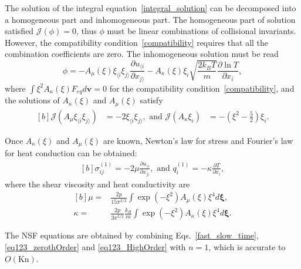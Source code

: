 The solution of the integral equation~\eqref{integral_solution} can be decomposed into a homogeneous part and inhomogeneous part. The homogeneous part of solution satisfied $\mathcal{J}(\phi)=0$, thus $\phi$ must be linear combinations of collisional invariants. However, the compatibility condition~\eqref{compatibility} requires that all the combination coefficients are zero. The inhomogeneous solution must be read
\begin{equation}
\phi=
-A_\mu(\xi)\xi_{\langle{i}} \xi_{j\rangle}\frac{\partial u_{\langle{i}}}{\partial x_{j\rangle}}
-A_\kappa(\xi)\xi_i\sqrt{\frac{2k_BT}{m}}\frac{\partial \ln{T}}{\partial x_i},
\end{equation}
where $\int \xi^2A_\kappa(\xi)F_{eq}d\bm{v}=0$ for the compatibility condition~\eqref{compatibility}, and the solutions of $A_\kappa(\xi)$ and $A_\mu(\xi)$ satisfy
\begin{equation}\label{transport_coefficient_0}
\begin{aligned}[b]
\mathcal{J}(A_\mu\xi_{\langle{i}} \xi_{j\rangle})&=-2\xi_{\langle{i}} \xi_{j\rangle},
\text{~and~}
\mathcal{J}(A_\kappa\xi_i)&=-\left(\xi^2-\frac{5}{2}\right)\xi_i.
\end{aligned}
\end{equation}


Once $A_\kappa(\xi)$ and $A_\mu(\xi)$ are known, Newton's law for stress and Fourier's law for heat conduction can be obtained:
\begin{equation}
\begin{aligned}[b]
\sigma^{(1)}_{ij}=-2\mu\frac{\partial u_{\langle i}}{\partial x_{j\rangle}},
\text{~and~}
q^{(1)}_i=-\kappa \frac{\partial T}{\partial x_i},
\end{aligned}
\end{equation} where the shear viscosity and heat conductivity are
\begin{equation}\label{viscosity_original}
\begin{aligned}[b]
\mu=&\frac{2p}{15\pi^{3/2}}\int\exp(-\xi^2)A_\mu(\xi)\xi^4d\bm{\xi},
\\
\kappa=&\frac{2p}{3\pi^{3/2}}
\frac{k_B}{m}
\int\exp(-\xi^2)A_\kappa(\xi)\xi^4
d\bm{\xi}.
\end{aligned}
\end{equation}

The NSF equations are obtained by combining Eqs.~\eqref{fast_slow_time}, \eqref{eq123_zerothOrder} and \eqref{eq123_HighOrder} with $n=1$, which is accurate to $O(\text{Kn})$. 



